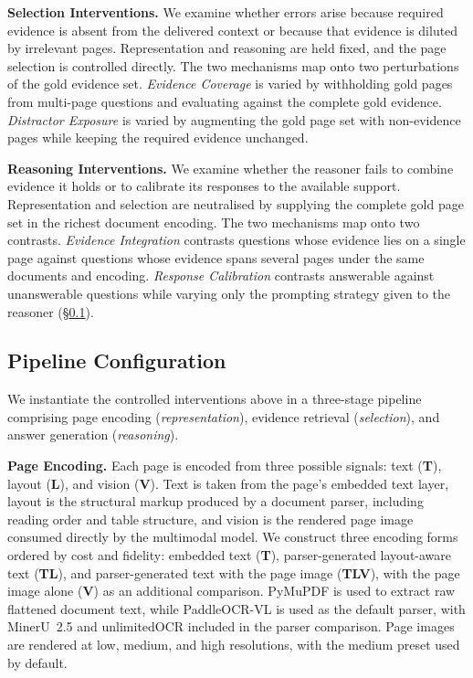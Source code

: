 \documentclass[11pt]{article}
\begin{document}
\textbf{Selection Interventions.} 
We examine whether errors arise because required evidence is absent from the delivered context or because that evidence is diluted by irrelevant pages. Representation and reasoning are held fixed, and the page selection is controlled directly. The two mechanisms map onto two perturbations of the gold evidence set. 
\emph{Evidence Coverage} is varied by withholding gold pages from multi-page questions and evaluating against the complete gold evidence. 
\emph{Distractor Exposure} is varied by augmenting the gold page set with non-evidence pages while keeping the required evidence unchanged.

\textbf{Reasoning Interventions.} 
We examine whether the reasoner fails to combine evidence it holds or to calibrate its responses to the available support. Representation and selection are neutralised by supplying the complete gold page set in the richest document encoding. The two mechanisms map onto two contrasts. 
\emph{Evidence Integration} contrasts questions whose evidence lies on a single page against questions whose evidence spans several pages under the same documents and encoding. 
\emph{Response Calibration} contrasts answerable against unanswerable questions while varying only the prompting strategy given to the reasoner (\S\ref{subsec:config}).

\subsection{Pipeline Configuration}
\label{subsec:config}

We instantiate the controlled interventions above in a three-stage pipeline comprising page encoding (\textit{representation}), evidence retrieval (\textit{selection}), and answer generation (\textit{reasoning}).

\textbf{Page Encoding.}
Each page is encoded from three possible signals: text (\textbf{T}), layout (\textbf{L}), and vision (\textbf{V}). Text is taken from the page's embedded text layer, layout is the structural markup produced by a document parser, including reading order and table structure, and vision is the rendered page image consumed directly by the multimodal model. We construct three encoding forms ordered by cost and fidelity: embedded text (\textbf{T}), parser-generated layout-aware text (\textbf{TL}), and parser-generated text with the page image (\textbf{TLV}), with the page image alone (\textbf{V}) as an additional comparison. PyMuPDF is used to extract raw flattened document text, while PaddleOCR-VL \cite{cui2025paddleocrvl} is used as the default parser, with MinerU~2.5 \cite{niu2025mineru25} and unlimitedOCR \cite{yin2026unlimitedocrworks} included in the parser comparison. Page images are rendered at low, medium, and high resolutions, with the medium preset used by default.
\end{document}
